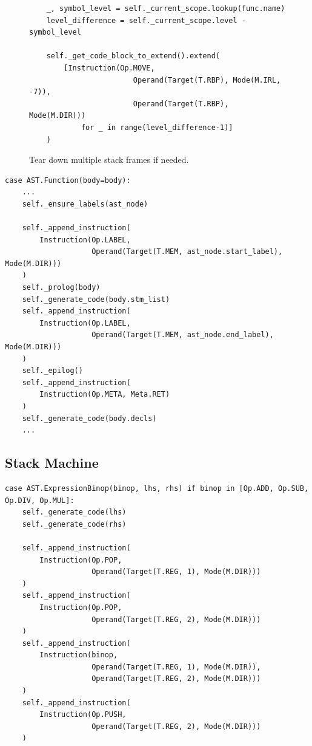 \begin{figure}[H]
    \centering
\begin{verbatim}
    _, symbol_level = self._current_scope.lookup(func.name)
    level_difference = self._current_scope.level - symbol_level
    
    self._get_code_block_to_extend().extend(
        [Instruction(Op.MOVE,
                        Operand(Target(T.RBP), Mode(M.IRL, -7)),
                        Operand(Target(T.RBP), Mode(M.DIR)))
            for _ in range(level_difference-1)]
    )
    \end{verbatim}
    \caption{Tear down multiple stack frames if needed.}
    \label{fig:remove_stack_frames}
\end{figure}

\begin{verbatim}
case AST.Function(body=body):
    ...
    self._ensure_labels(ast_node)

    self._append_instruction(
        Instruction(Op.LABEL,
                    Operand(Target(T.MEM, ast_node.start_label), Mode(M.DIR)))
    )
    self._prolog(body)
    self._generate_code(body.stm_list)
    self._append_instruction(
        Instruction(Op.LABEL,
                    Operand(Target(T.MEM, ast_node.end_label), Mode(M.DIR)))
    )
    self._epilog()
    self._append_instruction(
        Instruction(Op.META, Meta.RET)
    )
    self._generate_code(body.decls)
    ...
\end{verbatim}

\newpage

\subsection{Stack Machine}
\begin{verbatim}
case AST.ExpressionBinop(binop, lhs, rhs) if binop in [Op.ADD, Op.SUB, Op.DIV, Op.MUL]:
    self._generate_code(lhs)
    self._generate_code(rhs)

    self._append_instruction(
        Instruction(Op.POP,
                    Operand(Target(T.REG, 1), Mode(M.DIR)))
    )
    self._append_instruction(
        Instruction(Op.POP,
                    Operand(Target(T.REG, 2), Mode(M.DIR)))
    )
    self._append_instruction(
        Instruction(binop,
                    Operand(Target(T.REG, 1), Mode(M.DIR)),
                    Operand(Target(T.REG, 2), Mode(M.DIR)))
    )
    self._append_instruction(
        Instruction(Op.PUSH,
                    Operand(Target(T.REG, 2), Mode(M.DIR)))
    )
\end{verbatim}

